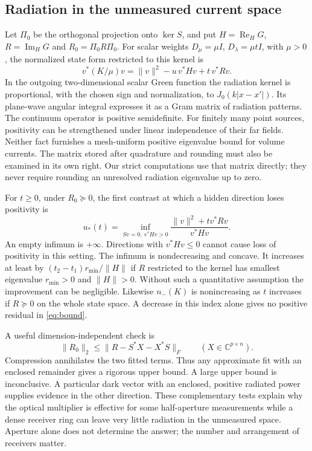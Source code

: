 \documentclass[anonymous,12pt]{iopjournal}
\theoremstyle{remark}\newtheorem{remark}[theorem]{Remark}
\newcommand{\C}{\mathbb C}\newcommand{\R}{\mathbb R}
\newcommand{\Herm}{\operatorname{Re}_{\!H}}\newcommand{\Imag}{\operatorname{Im}_{\!H}}
\numberwithin{equation}{section}
\begin{document}
\subsection{Radiation in the unmeasured current space}
Let $\Pi_0$ be the orthogonal projection onto $\ker S$, and put $H=\Herm G$, $R=\Imag G$ and $R_0=\Pi_0R\Pi_0$. For scalar weights $D_\mu=\mu I$, $D_\lambda=\mu t I$, with $\mu>0$, the normalized state form restricted to this kernel is
\begin{equation}
 v^*(K/\mu)v=\|v\|^2-u\,v^*Hv+t\,v^*Rv.\label{eq:dark}
\end{equation}
In the outgoing two-dimensional scalar Green function the radiation kernel is proportional, with the chosen sign and normalization, to $J_0(k|x-x'|)$. Its plane-wave angular integral expresses it as a Gram matrix of radiation patterns. The continuum operator is positive semidefinite. For finitely many point sources, positivity can be strengthened under linear independence of their far fields. Neither fact furnishes a mesh-uniform positive eigenvalue bound for volume currents. The matrix stored after quadrature and rounding must also be examined in its own right. Our strict computations use that matrix directly; they never require rounding an unresolved radiation eigenvalue up to zero.

For $t\ge0$, under $R_0\succeq0$, the first contrast at which a hidden direction loses positivity is
\begin{equation}
 u_*(t)=\inf_{Sv=0,\ v^*Hv>0}
             \frac{\|v\|^2+t v^*Rv}{v^*Hv}.\label{eq:threshold}
\end{equation}
An empty infimum is $+\infty$. Directions with $v^*Hv\le0$ cannot cause loss of positivity in this setting. The infimum is nondecreasing and concave. It increases at least by $(t_2-t_1)r_{\min}/\|H\|$ if $R$ restricted to the kernel has smallest eigenvalue $r_{\min}>0$ and $\|H\|>0$. Without such a quantitative assumption the improvement can be negligible. Likewise $n_-(K)$ is nonincreasing as $t$ increases if $R\succeq0$ on the whole state space. A decrease in this index alone gives no positive residual in \eqref{eq:bound}.

A useful dimension-independent check is
\begin{equation}
 \|R_0\|_2\le \|R-S^*X-X^*S\|_F\qquad(X\in\C^{p\times n}).\label{eq:radupper}
\end{equation}
Compression annihilates the two fitted terms. Thus any approximate fit with an enclosed remainder gives a rigorous upper bound. A large upper bound is inconclusive. A particular dark vector with an enclosed, positive radiated power supplies evidence in the other direction. These complementary tests explain why the optical multiplier is effective for some half-aperture measurements while a dense receiver ring can leave very little radiation in the unmeasured space. Aperture alone does not determine the answer; the number and arrangement of receivers matter.
\end{document}
